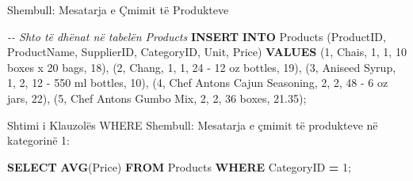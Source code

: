 \documentclass[
  ignorenonframetext,
]{beamer}
\newenvironment{Shaded}{\begin{snugshade}}{\end{snugshade}}
\newcommand{\CharTok}[1]{\textcolor[rgb]{0.31,0.60,0.02}{#1}}
\newcommand{\CommentTok}[1]{\textcolor[rgb]{0.56,0.35,0.01}{\textit{#1}}}
\newcommand{\DecValTok}[1]{\textcolor[rgb]{0.00,0.00,0.81}{#1}}
\newcommand{\FloatTok}[1]{\textcolor[rgb]{0.00,0.00,0.81}{#1}}
\newcommand{\FunctionTok}[1]{\textcolor[rgb]{0.13,0.29,0.53}{\textbf{#1}}}
\newcommand{\KeywordTok}[1]{\textcolor[rgb]{0.13,0.29,0.53}{\textbf{#1}}}
\newcommand{\NormalTok}[1]{#1}
\newcommand{\OperatorTok}[1]{\textcolor[rgb]{0.81,0.36,0.00}{\textbf{#1}}}
\newcommand{\StringTok}[1]{\textcolor[rgb]{0.31,0.60,0.02}{#1}}
\begin{document}
\begin{frame}[fragile]{Shembull: Mesatarja e Çmimit të Produkteve}
\label{shembull-mesatarja-e-uxe7mimit-tuxeb-produkteve-1}

\begin{Shaded}
\begin{Highlighting}[]
\CommentTok{{-}{-} Shto të dhënat në tabelën Products}
\KeywordTok{INSERT} \KeywordTok{INTO}\NormalTok{ Products (ProductID, ProductName, SupplierID, CategoryID, Unit, Price) }\KeywordTok{VALUES}
\NormalTok{(}\DecValTok{1}\NormalTok{, }\StringTok{\textquotesingle{}Chais\textquotesingle{}}\NormalTok{, }\DecValTok{1}\NormalTok{, }\DecValTok{1}\NormalTok{, }\StringTok{\textquotesingle{}10 boxes x 20 bags\textquotesingle{}}\NormalTok{, }\DecValTok{18}\NormalTok{),}
\NormalTok{(}\DecValTok{2}\NormalTok{, }\StringTok{\textquotesingle{}Chang\textquotesingle{}}\NormalTok{, }\DecValTok{1}\NormalTok{, }\DecValTok{1}\NormalTok{, }\StringTok{\textquotesingle{}24 {-} 12 oz bottles\textquotesingle{}}\NormalTok{, }\DecValTok{19}\NormalTok{),}
\NormalTok{(}\DecValTok{3}\NormalTok{, }\StringTok{\textquotesingle{}Aniseed Syrup\textquotesingle{}}\NormalTok{, }\DecValTok{1}\NormalTok{, }\DecValTok{2}\NormalTok{, }\StringTok{\textquotesingle{}12 {-} 550 ml bottles\textquotesingle{}}\NormalTok{, }\DecValTok{10}\NormalTok{),}
\NormalTok{(}\DecValTok{4}\NormalTok{, }\StringTok{\textquotesingle{}Chef Anton}\CharTok{\textquotesingle{}\textquotesingle{}}\StringTok{s Cajun Seasoning\textquotesingle{}}\NormalTok{, }\DecValTok{2}\NormalTok{, }\DecValTok{2}\NormalTok{, }\StringTok{\textquotesingle{}48 {-} 6 oz jars\textquotesingle{}}\NormalTok{, }\DecValTok{22}\NormalTok{),}
\NormalTok{(}\DecValTok{5}\NormalTok{, }\StringTok{\textquotesingle{}Chef Anton}\CharTok{\textquotesingle{}\textquotesingle{}}\StringTok{s Gumbo Mix\textquotesingle{}}\NormalTok{, }\DecValTok{2}\NormalTok{, }\DecValTok{2}\NormalTok{, }\StringTok{\textquotesingle{}36 boxes\textquotesingle{}}\NormalTok{, }\FloatTok{21.35}\NormalTok{);}
\end{Highlighting}
\end{Shaded}
\end{frame}

\begin{frame}[fragile]{Shtimi i Klauzolës WHERE}
\label{shtimi-i-klauzoluxebs-where}
Shembull: Mesatarja e çmimit të produkteve në kategorinë 1:


\begin{Shaded}
\begin{Highlighting}[]
\KeywordTok{SELECT} \FunctionTok{AVG}\NormalTok{(Price)}
\KeywordTok{FROM}\NormalTok{ Products}
\KeywordTok{WHERE}\NormalTok{ CategoryID }\OperatorTok{=} \DecValTok{1}\NormalTok{;}
\end{Highlighting}
\end{Shaded}
\end{frame}
\end{document}
